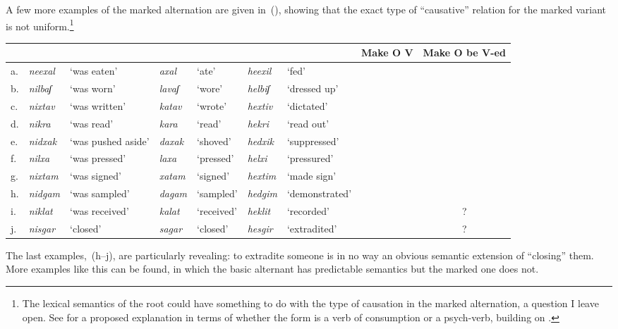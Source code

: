 A few more examples of the marked alternation are given in~(\nextx), showing that the exact type of ``causative'' relation for the marked variant is not uniform.\footnote{The lexical semantics of the root could have something to do with the type of causation in the marked alternation, a question I leave open. See \citet[44]{doron03} for a proposed explanation in terms of whether the {\tkal} form is a verb of consumption or a psych-verb, building on \cite{colesridhar77}.}
\ex\label{vd:ex:triplets-caus}
\xe
\begin{small}
\hspace{-4em}\begin{tabular}{l|ll|ll|llcc}
		\multicolumn{7}{c}{}		& Make O V	& Make O be V-ed\\\hline
		 a.& \emph{neexal}	& `was eaten'	& \emph{axal} & `ate'		& \emph{heexil} & `fed'			& \cmark	& \xmark\\
		 b.& \emph{nilbaʃ}	& `was worn'	& \emph{lavaʃ} & `wore' 	& \emph{helbiʃ}	&	`dressed up' 	& \cmark	& \xmark\\\hdashline
		 c.& \emph{nixtav} & `was written' & \emph{katav} & `wrote' & \emph{hextiv} & `dictated' & \xmark	& \cmark\\
		d.& \emph{nikra}	& `was read'	& \emph{kara} & `read'		& \emph{hekri}	& `read out'	& \xmark	& \cmark \\
		e.&	\emph{nidxak}	& `was pushed aside'	& \emph{daxak}	& `shoved'	& \emph{hedxik}	& `suppressed'\footnotemark	& \xmark	& \cmark\\
		f.& \emph{nilxa\texttslig}	& `was pressed' &  \emph{laxa\texttslig} & `pressed'	& \emph{helxi\texttslig} & `pressured'	& \xmark	& \cmark \\\hdashline
		 g.& \emph{nixtam}	& `was signed'	& \emph{xatam} & `signed'	& \emph{hextim}	& `made sign'	& \cmark	& \cmark\\\hdashline
		h. & \emph{nidgam} & `was sampled'	& \emph{dagam} & `sampled'	& \emph{hedgim}		& `demonstrated'	& \xmark	& \xmark\\
		i. & \emph{niklat} & `was received' & \emph{kalat} & `received' & \emph{heklit} & `recorded' & \xmark & \cmark?\\
		j.& \emph{nisgar}	& `closed'	& \emph{sagar} & `closed'		& \emph{hesgir} & `extradited'	& \xmark	& \cmark?\\
		\end{tabular}
\end{small}

The last examples,~(\lastx h--j), are particularly revealing: to extradite someone is in no way an obvious semantic extension of ``closing'' them. More examples like this can be found, in which the basic alternant has predictable semantics but the marked one does not.


